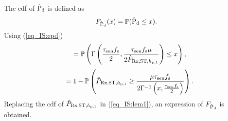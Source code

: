 \begin{IEEEproof}[Solution]
The cdf of $\hat{\text{P}}_{\text{d}}$ is defined as 
\begin{align}
F_{\hat{\text{P}}_{\text{d}}}(x) = \mathbb P(\hat{\text{P}}_{\text{d}} \le x).
\end{align}
Using (\ref{eq_IS:epd})
\begin{align}
\quad =  \mathbb P \left( \Gamma \left( \frac{\tau_{\text{sen}} f_{\text{s}}}{2}, \frac{\tau_{\text{sen}} f_{\text{s}} \mu}{2 \hat{P}_{\text{Rx,ST,$h_{\text{p,1}}$}}} \right) \le x \right), 
\end{align}
\begin{align}
\quad =  1- \mathbb P \left( \hat{P}_{\text{Rx,ST,$h_{\text{p,1}}$}} \ge \frac{\mu \tau_{\text{sen}} f_{\text{s}}}{2 {\Gamma}^{-1}\left( x, \frac{\tau_{\text{sen}} f_{\text{s}}}{2} \right) } \right). \label{eq_IS:lem1} 
\end{align}
Replacing the cdf of $\hat{P}_{\text{Rx,ST,$h_{\text{p,1}}$}}$ in (\ref{eq_IS:lem1}), an expression of $F_{\hat{\text{P}}_{\text{d}}}$ is obtained.
\end{IEEEproof}

